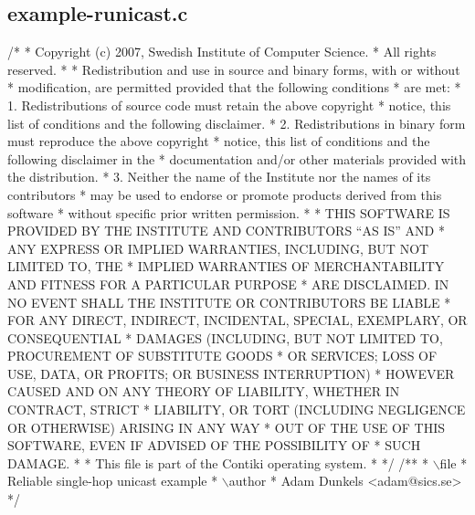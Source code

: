 \hypertarget{a00032}{}\subsection{example-\/runicast.\+c}

\begin{DoxyCodeInclude}
\textcolor{comment}{/*}
\textcolor{comment}{ * Copyright (c) 2007, Swedish Institute of Computer Science.}
\textcolor{comment}{ * All rights reserved.}
\textcolor{comment}{ *}
\textcolor{comment}{ * Redistribution and use in source and binary forms, with or without}
\textcolor{comment}{ * modification, are permitted provided that the following conditions}
\textcolor{comment}{ * are met:}
\textcolor{comment}{ * 1. Redistributions of source code must retain the above copyright}
\textcolor{comment}{ *    notice, this list of conditions and the following disclaimer.}
\textcolor{comment}{ * 2. Redistributions in binary form must reproduce the above copyright}
\textcolor{comment}{ *    notice, this list of conditions and the following disclaimer in the}
\textcolor{comment}{ *    documentation and/or other materials provided with the distribution.}
\textcolor{comment}{ * 3. Neither the name of the Institute nor the names of its contributors}
\textcolor{comment}{ *    may be used to endorse or promote products derived from this software}
\textcolor{comment}{ *    without specific prior written permission.}
\textcolor{comment}{ *}
\textcolor{comment}{ * THIS SOFTWARE IS PROVIDED BY THE INSTITUTE AND CONTRIBUTORS ``AS IS'' AND}
\textcolor{comment}{ * ANY EXPRESS OR IMPLIED WARRANTIES, INCLUDING, BUT NOT LIMITED TO, THE}
\textcolor{comment}{ * IMPLIED WARRANTIES OF MERCHANTABILITY AND FITNESS FOR A PARTICULAR PURPOSE}
\textcolor{comment}{ * ARE DISCLAIMED.  IN NO EVENT SHALL THE INSTITUTE OR CONTRIBUTORS BE LIABLE}
\textcolor{comment}{ * FOR ANY DIRECT, INDIRECT, INCIDENTAL, SPECIAL, EXEMPLARY, OR CONSEQUENTIAL}
\textcolor{comment}{ * DAMAGES (INCLUDING, BUT NOT LIMITED TO, PROCUREMENT OF SUBSTITUTE GOODS}
\textcolor{comment}{ * OR SERVICES; LOSS OF USE, DATA, OR PROFITS; OR BUSINESS INTERRUPTION)}
\textcolor{comment}{ * HOWEVER CAUSED AND ON ANY THEORY OF LIABILITY, WHETHER IN CONTRACT, STRICT}
\textcolor{comment}{ * LIABILITY, OR TORT (INCLUDING NEGLIGENCE OR OTHERWISE) ARISING IN ANY WAY}
\textcolor{comment}{ * OUT OF THE USE OF THIS SOFTWARE, EVEN IF ADVISED OF THE POSSIBILITY OF}
\textcolor{comment}{ * SUCH DAMAGE.}
\textcolor{comment}{ *}
\textcolor{comment}{ * This file is part of the Contiki operating system.}
\textcolor{comment}{ *}
\textcolor{comment}{ */}
\textcolor{comment}{}
\textcolor{comment}{/**}
\textcolor{comment}{ * \(\backslash\)file}
\textcolor{comment}{ *         Reliable single-hop unicast example}
\textcolor{comment}{ * \(\backslash\)author}
\textcolor{comment}{ *         Adam Dunkels <adam@sics.se>}
\textcolor{comment}{ */}


\end{DoxyCodeInclude}

